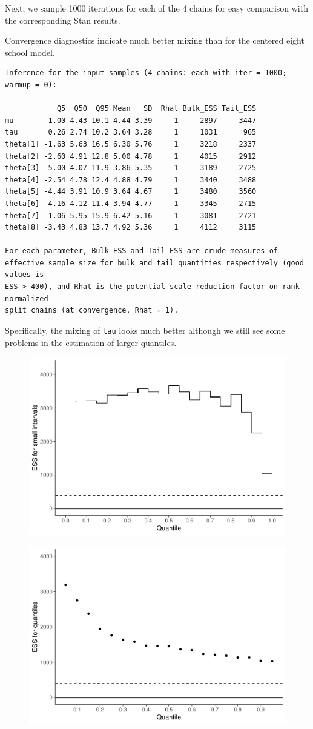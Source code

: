 \documentclass[american,]{article}
\begin{document}
Next, we sample 1000 iterations for each of the 4 chains for easy
comparison with the corresponding Stan results.

Convergence diagnostics indicate much better mixing than for the
centered eight school model.

\begin{verbatim}
Inference for the input samples (4 chains: each with iter = 1000; warmup = 0):

            Q5  Q50  Q95 Mean   SD  Rhat Bulk_ESS Tail_ESS
mu       -1.00 4.43 10.1 4.44 3.39     1     2897     3447
tau       0.26 2.74 10.2 3.64 3.28     1     1031      965
theta[1] -1.63 5.63 16.5 6.30 5.76     1     3218     2337
theta[2] -2.60 4.91 12.8 5.00 4.78     1     4015     2912
theta[3] -5.00 4.07 11.9 3.86 5.35     1     3189     2725
theta[4] -2.54 4.78 12.4 4.88 4.79     1     3440     3488
theta[5] -4.44 3.91 10.9 3.64 4.67     1     3480     3560
theta[6] -4.16 4.12 11.4 3.94 4.77     1     3345     2715
theta[7] -1.06 5.95 15.9 6.42 5.16     1     3081     2721
theta[8] -3.43 4.83 13.7 4.92 5.36     1     4112     3115

For each parameter, Bulk_ESS and Tail_ESS are crude measures of 
effective sample size for bulk and tail quantities respectively (good values is 
ESS > 400), and Rhat is the potential scale reduction factor on rank normalized
split chains (at convergence, Rhat = 1).
\end{verbatim}

Specifically, the mixing of \texttt{tau} looks much better although we
still see some problems in the estimation of larger quantiles.

\begin{figure}[t]
  \centering
  \includegraphics[width=0.6\linewidth]{graphics/local-ess-jags-ncp-tau-1.pdf}
\end{figure}

\begin{figure}[t]
  \centering
  \includegraphics[width=0.6\linewidth]{graphics/quantile-ess-jags-ncp-tau-1.pdf}
\end{figure}
\end{document}
